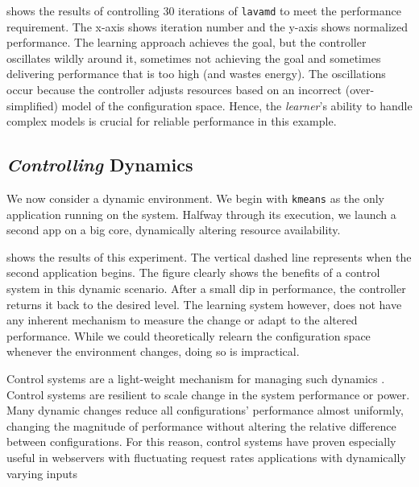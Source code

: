  shows the results of controlling 30
iterations of \texttt{lavamd} to meet the performance requirement.
The x-axis shows iteration number and the y-axis shows normalized
performance.  The learning approach achieves the goal, but the
controller oscillates wildly around it, sometimes not achieving the
goal and sometimes delivering performance that is too high (and wastes
energy). The oscillations occur because the controller adjusts
resources based on an incorrect (over-simplified) model of the
configuration space. Hence, the \emph{learner}'s ability to handle
complex models is crucial for reliable performance in this example.


\subsection{\emph{Controlling} Dynamics}
We now consider a dynamic environment.  We begin with \texttt{kmeans}
as the only application running on the system.  Halfway through its
execution, we launch a second app on a big core, dynamically altering
resource availability.

 shows the results of this experiment.
The vertical dashed line represents when the second application
begins.  The figure clearly shows the benefits of a control system in
this dynamic scenario.  After a small dip in performance, the
controller returns it back to the desired level.  The learning system
however, does not have any inherent mechanism to measure the change or
adapt to the altered performance.  While we could theoretically
relearn the configuration space whenever the environment changes,
doing so is impractical.

Control systems are a light-weight mechanism for managing such
dynamics \cite{Hellerstein2004a}. Control systems are resilient to
scale change in the system performance or power.  Many dynamic changes
reduce all configurations' performance almost uniformly, changing the
magnitude of performance without altering the relative difference
between configurations.  For this reason, control systems have proven
especially useful in webservers with fluctuating request rates
applications with dynamically varying inputs


